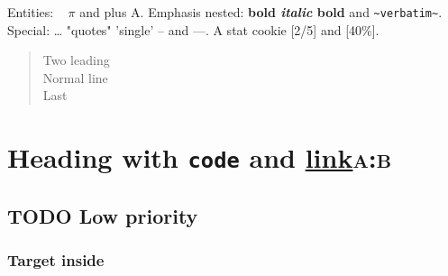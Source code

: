 Entities: ~ \(\pi\) \textcopyright{} \texteuro{} and \textonehalf{} plus A.
Emphasis nested: \textbf{bold \emph{italic} bold} and \texttt{\textasciitilde{}verbatim\textasciitilde{}}.
Special: \ldots{} "quotes" 'single' -- and ---.
A stat cookie [2/5] and [40\%].

\begin{verse}
\hspace*{2\fontdimen2\font}Two leading\\
Normal line\\
Last\\
\end{verse}
\section{Heading with \texttt{code} and \href{https://x.org}{link}\hfill{}\textsc{a:b}}
\label{sec:org47118c0}
\subsection{{\bfseries\sffamily TODO} Low priority}
\label{sec:orgaf3ed89}
\subsubsection{Target \label{org7bfd295} inside}
\label{sec:org1c59b52}
